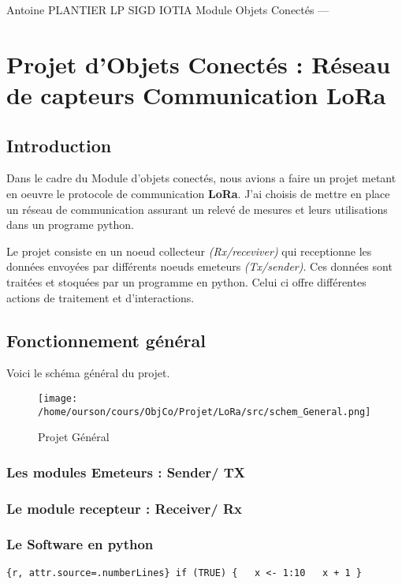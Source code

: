 \documentclass[]{article}
\date{}
\begin{document}
Antoine PLANTIER LP SIGD IOTIA Module Objets Conectés ---

\hypertarget{projet-dobjets-conectuxe9s-ruxe9seau-de-capteurs-communication-lora}{%
\section{Projet d'Objets Conectés : Réseau de capteurs Communication
LoRa}\label{projet-dobjets-conectuxe9s-ruxe9seau-de-capteurs-communication-lora}}

\hypertarget{introduction}{%
\subsection{Introduction}\label{introduction}}

Dans le cadre du Module d'objets conectés, nous avions a faire un projet
metant en oeuvre le protocole de communication \textbf{LoRa}. J'ai
choisis de mettre en place un réseau de communication assurant un relevé
de mesures et leurs utilisations dans un programe python.

Le projet consiste en un noeud collecteur \emph{(Rx/receviver)} qui
receptionne les données envoyées par différents noeuds emeteurs
\emph{(Tx/sender)}. Ces données sont traitées et stoquées par un
programme en python. Celui ci offre différentes actions de traitement et
d'interactions.

\hypertarget{fonctionnement-guxe9nuxe9ral}{%
\subsection{Fonctionnement général}\label{fonctionnement-guxe9nuxe9ral}}

Voici le schéma général du projet.

\begin{figure}
\centering
\texttt{[image: /home/ourson/cours/ObjCo/Projet/LoRa/src/schem\_General.png]}
\caption{Projet Général}
\end{figure}

\hypertarget{les-modules-emeteurs-sender-tx}{%
\subsubsection{Les modules Emeteurs : Sender/
TX}\label{les-modules-emeteurs-sender-tx}}

\hypertarget{le-module-recepteur-receiver-rx}{%
\subsubsection{Le module recepteur : Receiver/
Rx}\label{le-module-recepteur-receiver-rx}}

\hypertarget{le-software-en-python}{%
\subsubsection{Le Software en python}\label{le-software-en-python}}

\texttt{\{r,\ attr.source=\textquotesingle{}.numberLines\textquotesingle{}\}\ if\ (TRUE)\ \{\ \ \ x\ \textless{}-\ 1:10\ \ \ x\ +\ 1\ \}}
\end{document}
